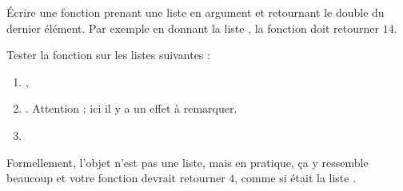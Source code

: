 
\begin{exercice}\label{exoPremiere-0056}

    Écrire une fonction prenant une liste en argument et retournant le double du dernier élément. Par exemple en donnant la liste \info{[1,8,3,7]}, la fonction doit retourner \( 14\).

    Tester la fonction sur les listes suivantes :
    \begin{enumerate}
        \item
            \info{[1,2,4]},
        \item
            . Attention : ici il y a un effet à remarquer.
        \item
    \end{enumerate}

            Formellement, l'objet  n'est pas une liste, mais en pratique, ça y ressemble beaucoup et votre fonction devrait retourner \( 4\), comme si  était la liste \info{[1,2,3,4]}.

\end{exercice}
